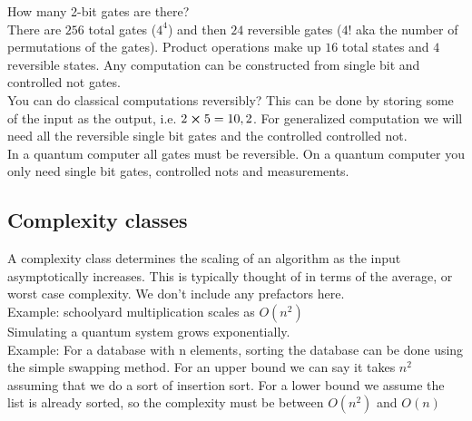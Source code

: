 How many 2-bit gates are there? \\
There are $256$ total gates ($4^4$) and then $24$ reversible gates  ($4!$ aka the number of permutations of the gates). Product operations make up $16$ total states and $4$ reversible states. Any computation can be constructed from single bit and controlled not gates. \\
You can do classical computations reversibly? This can be done by storing some of the input as the output, i.e. $2 \cross 5 = 10,2$. For generalized computation we will need all the reversible single bit gates and the controlled controlled not. \\
In a quantum computer all gates must be reversible. On a quantum computer you only need single bit gates, controlled nots and measurements.
\subsection{Complexity classes}
A complexity class determines the scaling of an algorithm as the input asymptotically increases. This is typically thought of in terms of the average, or worst case complexity. We don't include any prefactors here. \\
Example: schoolyard multiplication scales as $O(n^2)$ \\
Simulating a quantum system grows exponentially. \\
Example: For a database with n elements, sorting the database can be done using the simple swapping method. For an upper bound we can say it takes $n^2$ assuming that we do a sort of insertion sort. For a lower bound we assume the list is already sorted, so the complexity must be between $O(n^2)$ and $O(n)$
